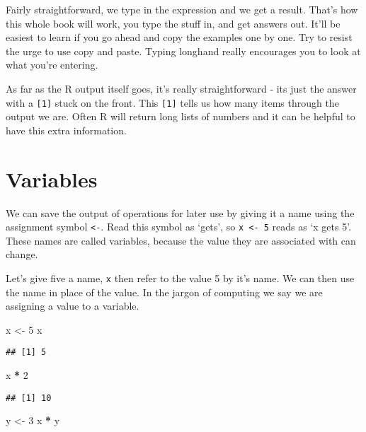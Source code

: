 \documentclass[
]{book}
\newenvironment{Shaded}{\begin{snugshade}}{\end{snugshade}}
\newcommand{\DecValTok}[1]{\textcolor[rgb]{0.00,0.00,0.81}{#1}}
\newcommand{\NormalTok}[1]{#1}
\newcommand{\OperatorTok}[1]{\textcolor[rgb]{0.81,0.36,0.00}{\textbf{#1}}}
\newcommand{\StringTok}[1]{\textcolor[rgb]{0.31,0.60,0.02}{#1}}
\begin{document}
Fairly straightforward, we type in the expression and we get a result. That's how this whole book will work, you type the stuff in, and get answers out. It'll be easiest to learn if you go ahead and copy the examples one by one. Try to resist the urge to use copy and paste. Typing longhand really encourages you to look at what you're entering.

As far as the R output itself goes, it's really straightforward - its just the answer with a \texttt{{[}1{]}} stuck on the front. This \texttt{{[}1{]}} tells us how many items through the output we are. Often R will return long lists of numbers and it can be helpful to have this extra information.

\hypertarget{variables}{%
\section{Variables}\label{variables}}

We can save the output of operations for later use by giving it a name using the assignment symbol \texttt{\textless{}-}. Read this symbol as `gets', so \texttt{x\ \textless{}-\ 5} reads as `x gets 5'. These names are called variables, because the value they are associated with can change.

Let's give five a name, \texttt{x} then refer to the value 5 by it's name. We can then use the name in place of the value. In the jargon of computing we say we are assigning a value to a variable.

\begin{Shaded}
\begin{Highlighting}[]
\NormalTok{ x <-}\StringTok{ }\DecValTok{5}
\NormalTok{ x}
\end{Highlighting}
\end{Shaded}

\begin{verbatim}
## [1] 5
\end{verbatim}

\begin{Shaded}
\begin{Highlighting}[]
\NormalTok{ x }\OperatorTok{*}\StringTok{ }\DecValTok{2}
\end{Highlighting}
\end{Shaded}

\begin{verbatim}
## [1] 10
\end{verbatim}

\begin{Shaded}
\begin{Highlighting}[]
\NormalTok{y <-}\StringTok{ }\DecValTok{3}
\NormalTok{x }\OperatorTok{*}\StringTok{ }\NormalTok{y}
\end{Highlighting}
\end{Shaded}
\end{document}
